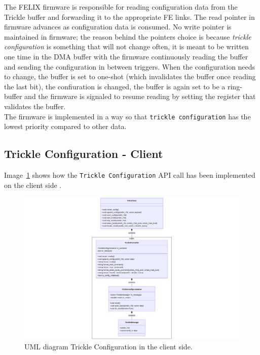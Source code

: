 The \acs{FELIX} firmware is responsible for reading configuration data from the Trickle buffer and forwarding it to the appropriate \acs{FE} links. The read pointer in firmware advances as configuration data is consumed. No write pointer is maintained in firmware; the reason behind the pointers choice is because \textit{trickle configuration} is something that will not change often, it is meant to be written one time in the \acs{DMA} buffer with the firmware continuously reading the buffer and sending the configuration in between triggers. When the configuration needs to change, the buffer is set to one-shot (which invalidates the buffer once reading the last bit), the confiuration is changed, the buffer is again set to be a ring-buffer and the firmware is signaled to resume reading by setting the register that validates the buffer.\\
The firmware is implemented in a way so that \texttt{trickle configuration} has the lowest priority compared to other data.

\subsection{Trickle Configuration - Client}

Image~\ref{fig:trickle-client-uml} shows how the \texttt{Trickle Configuration} \acs{API} call has been implemented on the client side \cite{felix-star-trickle-client}. 

\begin{figure}[htbp]
\centering
\includegraphics[width=\textwidth]{images/contributions/client-trickle-config-uml.png}
\caption{UML diagram Trickle Configuration in the client side.}
\label{fig:trickle-client-uml}
\end{figure}

